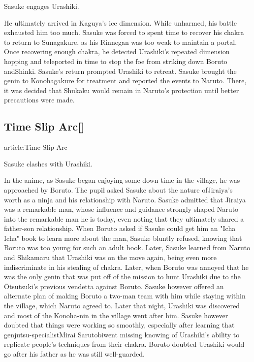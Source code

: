 \documentclass[a4paper,12pt]{article}
\begin{document}
Sasuke engages Urashiki.\\ \par \vspace{0.5cm}

He ultimately arrived in Kaguya's ice dimension. While unharmed, his battle exhausted him too much. Sasuke was forced to spent time to recover his chakra to return to Sunagakure, as his Rinnegan was too weak to maintain a portal. Once recovering enough chakra, he detected Urashiki's repeated dimension hopping and teleported in time to stop the foe from striking down Boruto andShinki. Sasuke's return prompted Urashiki to retreat. Sasuke brought the genin to Konohagakure for treatment and reported the events to Naruto. There, it was decided that Shukaku would remain in Naruto's protection until better precautions were made.\\ \par \vspace{0.5cm}

\subsection*{Time Slip Arc[]}\n\nMain article:Time Slip Arc\\ \par \vspace{0.5cm}

Sasuke clashes with Urashiki.\\ \par \vspace{0.5cm}

In the anime, as Sasuke began enjoying some down-time in the village, he was approached by Boruto. The pupil asked Sasuke about the nature ofJiraiya's worth as a ninja and his relationship with Naruto. Sasuke admitted that Jiraiya was a remarkable man, whose influence and guidance strongly shaped Naruto into the remarkable man he is today, even noting that they ultimately shared a father-son relationship. When Boruto asked if Sasuke could get him an "Icha Icha" book to learn more about the man, Sasuke bluntly refused, knowing that Boruto was too young for such an adult book. Later, Sasuke learned from Naruto and Shikamaru that Urashiki was on the move again, being even more indiscriminate in his stealing of chakra. Later, when Boruto was annoyed that he was the only genin that was put off of the mission to hunt Urashiki due to the Ōtsutsuki's previous vendetta against Boruto. Sasuke however offered an alternate plan of making Boruto a two-man team with him while staying within the village, which Naruto agreed to. Later that night, Urashiki was discovered and most of the Konoha-nin in the village went after him. Sasuke however doubted that things were working so smoothly, especially after learning that genjutsu-specialistMirai Sarutobiwent missing knowing of Urashiki's ability to replicate people's techniques from their chakra. Boruto doubted Urashiki would go after his father as he was still well-guarded.\\ \par \vspace{0.5cm}
\end{document}
